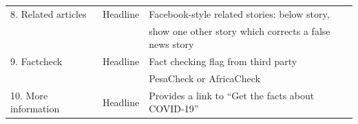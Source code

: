 \documentclass[letterpaper, 12pt, parskip=full,DIV=10]{scrartcl}
\begin{document}
\begin{table}[H]
\begin{adjustbox}{max width = \textwidth}
\begin{tabular}{l|l|l}
\\
8. Related articles                                                                                                       & Headline                                                                                                     & Facebook-style related stories: below story,\\ & & show one other story which corrects a false news story                                                                                                                                                                                                                                                                                             \\
9. Factcheck                                                                                                      & Headline                                                                                                     & Fact checking flag from third party\\ & & PesaCheck or AfricaCheck
 \\
10. More information                                                                                                      & Headline                                                                                                     & Provides a link to ``Get the facts about COVID-19''\\

\end{tabular}
\end{adjustbox}
\end{table}
\end{document}
